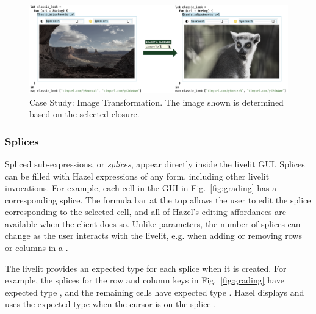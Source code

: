 \begin{figure}
  \begin{center}
    \includegraphics[width=40pc]{img-filter.png}
  \end{center}
  \caption{Case Study: Image Transformation. The image shown is determined based on the selected closure.}
  \label{fig:img-transformation}
\end{figure}


\subsubsection{Splices}\label{sec:splices}
Spliced sub-expressions, or \emph{splices}, appear directly inside the livelit GUI.
Splices can be filled with Hazel expressions of any form, including other livelit invocations.
For example, each cell in the  GUI in Fig.~\ref{fig:grading}
has a corresponding splice. The formula bar at the top
allows the user to edit the splice corresponding to the selected cell,
and all of Hazel's editing affordances are available when the client does so.
Unlike parameters, the number of splices can change
as the user interacts with the livelit, e.g. when adding or removing rows or columns in a .

The livelit provides an expected type for each splice when it is created.
For example, the splices for the row and column keys in Fig.~\ref{fig:grading} have expected type ,
and the remaining cells have expected type .
Hazel displays and uses the expected type when the cursor is on the splice \cite{hazeltutor}.

